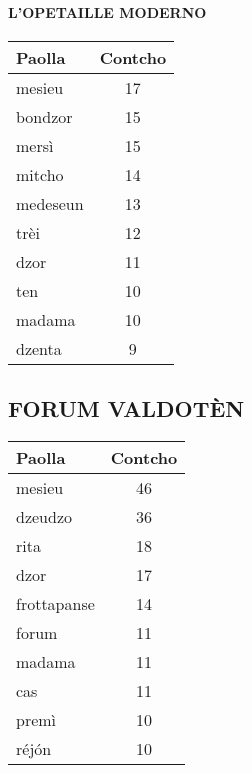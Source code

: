 \begin{minipage}{0.48\textwidth}
\paragraph*{L’OPETAILLE MODERNO}
\begin{tabular}{lc}
\toprule
\textbf{Paolla} & \textbf{Contcho} \\
\midrule
mesieu & 17 \\
bondzor & 15 \\
mersì & 15 \\
mitcho & 14 \\
medeseun & 13 \\
trèi & 12 \\
dzor & 11 \\
ten & 10 \\
madama & 10 \\
dzenta & 9 \\
\bottomrule
\end{tabular}
\end{minipage}
\hfill
\begin{minipage}{0.48\textwidth}
\subsection*{FORUM VALDOT\`EN}
\begin{tabular}{lc}
\toprule
\textbf{Paolla} & \textbf{Contcho} \\
\midrule
mesieu & 46 \\
dzeudzo & 36 \\
rita & 18 \\
dzor & 17 \\
frottapanse & 14 \\
forum & 11 \\
madama & 11 \\
cas & 11 \\
premì & 10 \\
réjón & 10 \\
\bottomrule
\end{tabular}
\end{minipage}

